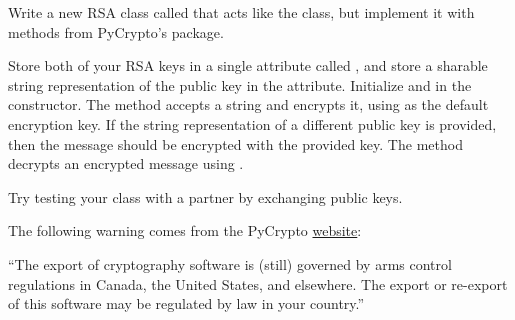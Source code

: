 \begin{comment}

The RSA encryption and decryption methods on these keys are textbook approaches.
However, to increase security, we will want to pad the messages so every message encrypted with a particular key will become exactly as large (in bits) as the key itself.
A commonly used padding algorithm is implemented in PyCrypto in the \li{Crypto.Cipher.PKCS1_OAEP} module.
\begin{lstlisting}
>>> from Crypto.Cipher import PKCS1_OAEP as oaep

# generate a new key from the original RSA key.
# This key can encrypt and decrypt
>>> paddedkey = oaep.new(keypair)
>>> encrypted = paddedkey.encrypt('hello world')
>>> paddedkey.decrypt(encrypted)
'hello world'
\end{lstlisting}
\end{comment}

\begin{problem}
Write a new RSA class called  that acts like the  class, but implement it with methods from PyCrypto's  package.

Store both of your RSA keys in a single attribute called , and store a sharable string representation of the public key in the  attribute.
Initialize  and  in the constructor.
The  method accepts a string and encrypts it, using  as the default encryption key.
If the string representation of a different public key is provided, then the message should be encrypted with the provided key.
The  method decrypts an encrypted message using .

Try testing your class with a partner by exchanging public keys.
\end{problem}

\begin{warn}
The following warning comes from the PyCrypto \href{https://www.dlitz.net/software/pycrypto/}{website}:

``The export of cryptography software is (still) governed by arms control regulations in Canada, the United States, and elsewhere.
The export or re-export of this software may be regulated by law in your country.''
\end{warn}


